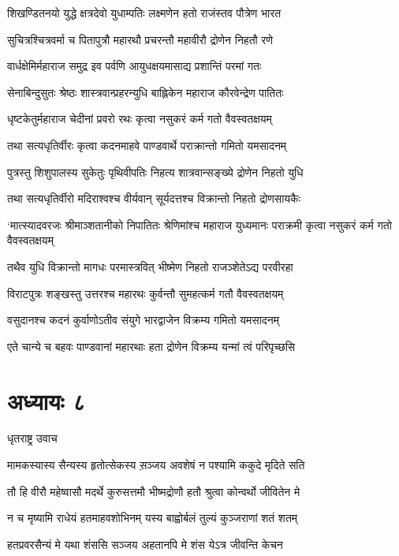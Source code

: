 \twolineshloka
{शिखण्डितनयो युद्धे क्षत्रदेवो युधाम्पतिः}
{लक्ष्मणेन हतो राजंस्तव पौत्रेण भारत}


\twolineshloka
{सुचित्रश्चित्रवर्मा च पितापुत्रौ महारथौ}
{प्रचरन्तौ महावीरौ द्रोणेन निहतौ रणे}


\twolineshloka
{वार्धक्षेमिर्महाराज समुद्र इव पर्वणि}
{आयुधक्षयमासाद्य प्रशान्तिं परमां गतः}


\twolineshloka
{सेनाबिन्दुसुतः श्रेष्ठः शास्त्रवान्प्रहरन्युधि}
{बाह्लिकेन महाराज कौरवेन्द्रेण पातितः}


\twolineshloka
{धृष्टकेतुर्महाराज चेदीनां प्रवरो रथः}
{कृत्वा नसुकरं कर्म गतो वैवस्वतक्षयम्}


\twolineshloka
{तथा सत्यधृतिर्वीरः कृत्वा कदनमाहवे}
{पाण्डवार्थे पराक्रान्तो गमितो यमसादनम्}


\twolineshloka
{पुत्रस्तु शिशुपालस्य सुकेतुः पृथिवीपतिः}
{निहत्य शात्रवान्सङ्ख्ये द्रोणेन निहतो युधि}


\twolineshloka
{तथा सत्यधृतिर्वीरो मदिराश्वश्च वीर्यवान्}
{सूर्यदत्तश्च विक्रान्तो निहतो द्रोणसायकैः}


\threelineshloka
{`मात्स्यादवरजः श्रीमाञ्शतानीको निपातितः}
{श्रेणिमांश्च महाराज युध्यमानः पराक्रमी}
{कृत्वा नसुकरं कर्म गतो वैवस्वतक्षयम्}


\twolineshloka
{तथैव युधि विक्रान्तो मागधः परमास्त्रवित्}
{भीष्मेण निहतो राजञ्शेतेऽद्य परवीरहा}


\twolineshloka
{विराटपुत्रः शङ्खस्तु उत्तरश्च महारथः}
{कुर्वन्तौ सुमहत्कर्म गतौ वैवस्वतक्षयम्}


\twolineshloka
{वसुदानश्च कदनं कुर्वाणोऽतीव संयुगे}
{भारद्वाजेन विक्रम्य गमितो यमसादनम्}


\twolineshloka
{एते चान्ये च बहवः पाण्डवानां महारथाः}
{हता द्रोणेन विक्रम्य यन्मां त्वं परिपृच्छसि}


\chapter{अध्यायः ८}
\twolineshloka
{धृतराष्ट्र उवाच}
{}


\twolineshloka
{मामकस्यास्य सैन्यस्य हृतोत्सेकस्य स़ञ्जय}
{अवशेषं न पश्यामि ककुदे मृदिते सति}


\twolineshloka
{तौ हि वीरौ महेष्वासौ मदर्थे कुरुसत्तमौ}
{भीष्मद्रोणौ हतौ श्रुत्वा कोन्वर्थो जीवितेन मे}


\twolineshloka
{न च मृष्यामि राधेयं हतमाहवशोभिनम्}
{यस्य बाह्वोर्बलं तुल्यं कुञ्जराणां शतं शतम्}


\twolineshloka
{हतप्रवरसैन्यं मे यथा शंससि सञ्जय}
{अहतानपि मे शंस येऽत्र जीवन्ति केचन}


